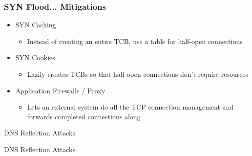 \documentclass{beamer}
\begin{document}
\begin{frame}
	\frametitle{SYN Flood... Mitigations}
	\begin{itemize}
		\item SYN Caching
			\begin{itemize}
				\item Instead of creating an entire TCB, use a table for half-open
					connections
			\end{itemize}
		\item SYN Cookies
			\begin{itemize}
				\item Lazily creates TCBs so that half open connections don't require
					resources %
			\end{itemize}
		\item Application Firewalls / Proxy
			\begin{itemize}
				\item Lets an external system do all the TCP connection management and
					forwards completed connections along
			\end{itemize}
	\end{itemize}
\end{frame}

\begin{frame}{DNS Reflection Attacks}
	\begin{center}
		\vspace*{\fill}
		{\Large DNS Reflection Attacks}
		\vspace*{\fill}
	\end{center}

\end{frame}
\end{document}

